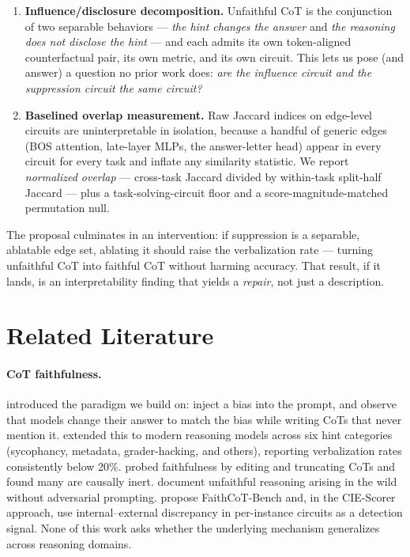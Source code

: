\documentclass[11pt]{article}
\begin{document}
\begin{enumerate}[leftmargin=1.2em, itemsep=2pt]
  \item \textbf{Influence/disclosure decomposition.} Unfaithful CoT is the conjunction of two separable behaviors --- \emph{the hint changes the answer} and \emph{the reasoning does not disclose the hint} --- and each admits its own token-aligned counterfactual pair, its own metric, and its own circuit. This lets us pose (and answer) a question no prior work does: \emph{are the influence circuit and the suppression circuit the same circuit?}
  \item \textbf{Baselined overlap measurement.} Raw Jaccard indices on edge-level circuits are uninterpretable in isolation, because a handful of generic edges (BOS attention, late-layer MLPs, the answer-letter head) appear in every circuit for every task and inflate any similarity statistic. We report \emph{normalized overlap} --- cross-task Jaccard divided by within-task split-half Jaccard --- plus a task-solving-circuit floor and a score-magnitude-matched permutation null.
\end{enumerate}

The proposal culminates in an intervention: if suppression is a separable, ablatable edge set, ablating it should raise the verbalization rate --- turning unfaithful CoT into faithful CoT without harming accuracy. That result, if it lands, is an interpretability finding that yields a \emph{repair}, not just a description.

\section{Related Literature}
\label{sec:related}

\paragraph{CoT faithfulness.} \citet{turpin2023} introduced the paradigm we build on: inject a bias into the prompt, and observe that models change their answer to match the bias while writing CoTs that never mention it. \citet{chen2025} extended this to modern reasoning models across six hint categories (sycophancy, metadata, grader-hacking, and others), reporting verbalization rates consistently below 20\%. \citet{lanham2023} probed faithfulness by editing and truncating CoTs and found many are causally inert. \citet{arcuschin2025} document unfaithful reasoning arising in the wild without adversarial prompting. \citet{shen2026} propose FaithCoT-Bench and, in the CIE-Scorer approach, use internal--external discrepancy in per-instance circuits as a detection signal. None of this work asks whether the underlying mechanism generalizes across reasoning domains.
\end{document}
